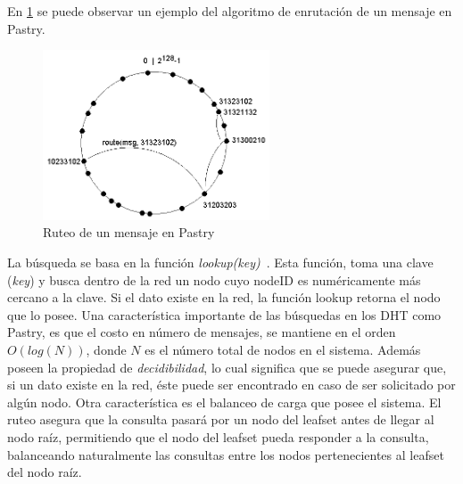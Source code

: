 

 En \ref{fig:p2p_pastry_routing} se puede
observar un ejemplo del algoritmo de enrutación de un mensaje en Pastry.

\begin{figure}
\center
\includegraphics[width=0.6\textwidth]{img/pastryrouting}
\caption{Ruteo de un mensaje en Pastry}
\label{fig:p2p_pastry_routing}
\end{figure}


La búsqueda se basa en la función
\textit{lookup(key)}~\cite{BalakrishnanEtAl03}. Esta función, toma una
clave (\textit{key}) y busca dentro de la red un nodo cuyo nodeID es
numéricamente más cercano a la clave.  Si el dato existe en la red, la función
lookup retorna el nodo que lo posee.  Una característica importante de las
búsquedas en los DHT como Pastry, es que el costo en número de mensajes, se
mantiene en el orden $O(log(N ))$, donde $N$ es el número total de nodos en el
sistema. Además poseen la propiedad de \textit{decidibilidad}, lo cual significa
que se puede asegurar que, si un dato existe en la red, éste puede ser
encontrado en caso de ser solicitado por algún nodo. Otra característica es el
balanceo de carga que posee el sistema. El ruteo asegura
que la consulta pasará por un nodo del leafset antes de llegar al nodo raíz,
permitiendo que el nodo del leafset pueda responder a la consulta, balanceando naturalmente las
consultas entre los nodos pertenecientes al leafset del nodo raíz.



